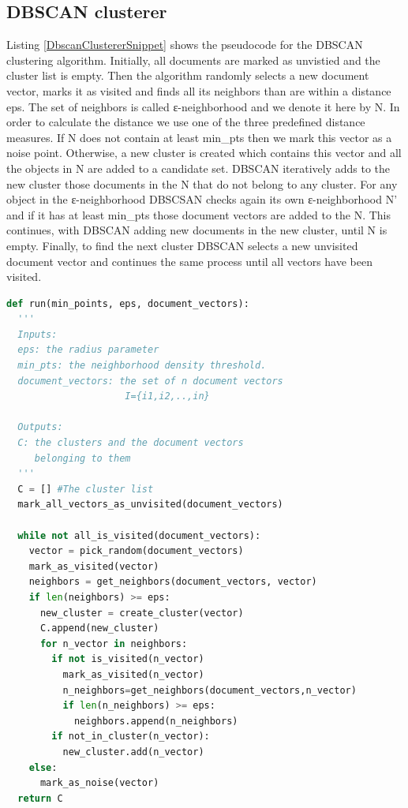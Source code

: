 \subsection{DBSCAN clusterer}
Listing \ref{DbscanClustererSnippet} shows the pseudocode for the DBSCAN clustering algorithm. Initially,
all documents are marked as unvistied and the cluster list is empty. Then the algorithm randomly selects a new document vector, marks it as visited and finds all its neighbors than are within a distance eps. The set of neighbors is called ε-neighborhood and we denote it here by N. In order to calculate the distance we use one of the three predefined distance measures. If N does not contain at least min\_pts then we mark this vector as a noise point. Otherwise, a new cluster is created which contains this vector and all the objects in N are added to a candidate set. DBSCAN iteratively adds to the new cluster those documents in the N that do not belong to any cluster. For any object in the ε-neighborhood DBSCSAN checks again its own ε-neighborhood N' and if it has at least min\_pts those document vectors are added to the N. This continues, with DBSCAN adding new documents in the new cluster, until N is empty. Finally, to find the next cluster DBSCAN selects a new unvisited document vector and continues the same process until all vectors have been visited.  

\begin{lstlisting}[language=Python, label=DbscanClustererSnippet, caption=Pseudocode for DBSCAN algorithm]
def run(min_points, eps, document_vectors):
  '''
  Inputs: 
  eps: the radius parameter
  min_pts: the neighborhood density threshold.
  document_vectors: the set of n document vectors 
                     I={i1,i2,..,in}
  
  Outputs:
  C: the clusters and the document vectors 
     belonging to them
  '''
  C = [] #The cluster list
  mark_all_vectors_as_unvisited(document_vectors)
  
  while not all_is_visited(document_vectors):  
    vector = pick_random(document_vectors)
    mark_as_visited(vector)
    neighbors = get_neighbors(document_vectors, vector)
    if len(neighbors) >= eps:
      new_cluster = create_cluster(vector) 
      C.append(new_cluster)
      for n_vector in neighbors:
        if not is_visited(n_vector) 
          mark_as_visited(n_vector)
          n_neighbors=get_neighbors(document_vectors,n_vector)
          if len(n_neighbors) >= eps:
            neighbors.append(n_neighbors)
        if not_in_cluster(n_vector):
          new_cluster.add(n_vector)
    else:
      mark_as_noise(vector) 
  return C
\end{lstlisting}
